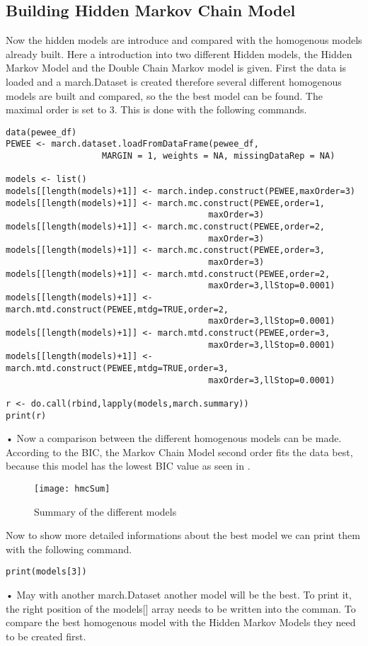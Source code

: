 \subsection{Building Hidden Markov Chain Model}
Now the hidden models are introduce and compared with the homogenous models already built. Here a introduction into two different Hidden models, the Hidden Markov Model and the Double Chain Markov model is given. First the data is loaded and a march.Dataset is created therefore several different homogenous models are built and compared, so the the best model can be found. The maximal order is set to 3. This is done with the following commands. 
\begin{verbatim}
data(pewee_df)
PEWEE <- march.dataset.loadFromDataFrame(pewee_df, 
                   MARGIN = 1, weights = NA, missingDataRep = NA)

models <- list()
models[[length(models)+1]] <- march.indep.construct(PEWEE,maxOrder=3)
models[[length(models)+1]] <- march.mc.construct(PEWEE,order=1,
										maxOrder=3)
models[[length(models)+1]] <- march.mc.construct(PEWEE,order=2,
										maxOrder=3)
models[[length(models)+1]] <- march.mc.construct(PEWEE,order=3,
										maxOrder=3)
models[[length(models)+1]] <- march.mtd.construct(PEWEE,order=2,
										maxOrder=3,llStop=0.0001)
models[[length(models)+1]] <- march.mtd.construct(PEWEE,mtdg=TRUE,order=2,
										maxOrder=3,llStop=0.0001)
models[[length(models)+1]] <- march.mtd.construct(PEWEE,order=3,
										maxOrder=3,llStop=0.0001)
models[[length(models)+1]] <- march.mtd.construct(PEWEE,mtdg=TRUE,order=3,
										maxOrder=3,llStop=0.0001)

r <- do.call(rbind,lapply(models,march.summary))
print(r)
\end{verbatim}•
Now a comparison between the different homogenous models can be made. According to the BIC, the Markov Chain Model second order fits the data best, because this model has the lowest BIC value as seen in .   
\begin{figure}[h]
    \centering
    \texttt{[image: hmcSum]}
    \caption{Summary of the different models}
    \label{fig:hmcSum}
\end{figure}
Now to show more detailed informations about the best model we can print them with the following command.
\begin{verbatim}
print(models[3])
\end{verbatim}•
May with another march.Dataset another model will be the best. To print it, the right position of the models[] array needs to be written into the comman. To compare the best homogenous model with the Hidden Markov Models they need to be created first. \\
